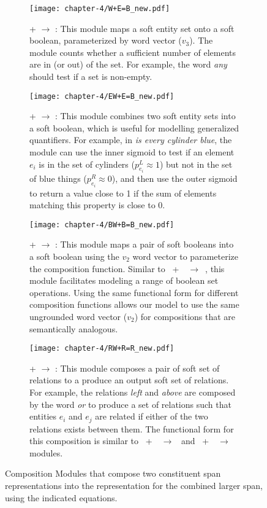 \begin{figure}[t]
   \smallskip

  \begin{subfigure}[t]{.48\textwidth}
    \centering
    \texttt{[image: chapter-4/W+E=B\_new.pdf]}
    \caption{\label{fig:web}\scriptsize{ +  $\rightarrow$ : This module maps a soft entity set onto a soft boolean, parameterized by word vector ($v_{3}$).  The module counts whether a sufficient number of elements are in (or out) of the set. For example, the word \emph{any} should test if a set is non-empty.}}
  \end{subfigure}
  \hfill
  \begin{subfigure}[t]{.48\textwidth}
    \centering
    \texttt{[image: chapter-4/EW+E=B\_new.pdf]}
    \caption{\label{fig:eweb}\scriptsize{ +  $\rightarrow$ : This module combines two soft entity sets into a soft boolean, which is useful for     modelling generalized quantifiers. For example, in \emph{is every cylinder blue}, the module can use the inner sigmoid to test if an element $e_i$ is in the set of cylinders ($p^{L}_{e_{i}}\approx 1$) but not in the set of blue things ($p^{R}_{e_{i}}\approx 0$), and then use the outer sigmoid to return a value close to 1 if the sum of elements matching this property is close to 0.  }}
  \end{subfigure}

   \smallskip

  \begin{subfigure}[t]{.48\textwidth}
    \centering
    \texttt{[image: chapter-4/BW+B=B\_new.pdf]}
    \caption{\label{fig:bwbb}\scriptsize{ +  $\rightarrow$ : This module maps a pair of soft booleans into a soft boolean using the $v_{2}$ word vector to parameterize the composition function. Similar to ~+~~$\rightarrow$~, this module facilitates modeling a range of boolean set operations. Using the same functional form for different composition functions allows our model to use the same ungrounded word vector ($v_{2}$) for compositions that are semantically analogous.}}
  \end{subfigure}
  \hfill
  \begin{subfigure}[t]{.48\textwidth}
    \centering
    \texttt{[image: chapter-4/RW+R=R\_new.pdf]}
    \caption{\label{fig:rwrr}\scriptsize{ +  $\rightarrow$ : This module composes a pair of soft set of relations to a produce an output soft set of relations. For example, the relations \emph{left} and \emph{above} are composed by the word \emph{or} to produce a set of relations such that entities $e_{i}$ and $e_{j}$ are related if either of the two relations exists between them. The functional form for this composition is similar to ~+~~$\rightarrow$~ and ~+~~$\rightarrow$~ modules. }}
  \end{subfigure}

  \caption{\label{fig:04-modules} \footnotesize{Composition Modules that compose two constituent span representations into the representation for the combined larger span, using the indicated equations.}}
\end{figure}

